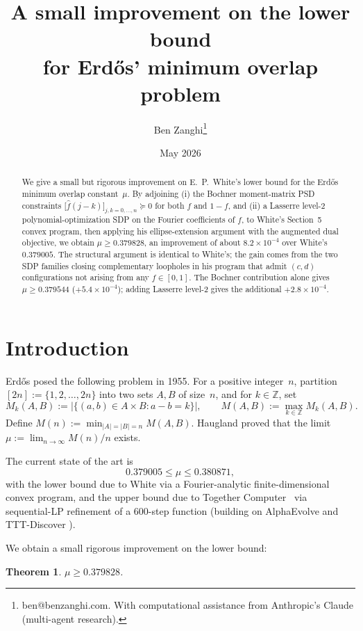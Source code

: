 \documentclass[11pt]{article}
\title{A small improvement on the lower bound\\
for Erd\H{o}s' minimum overlap problem}
\author{Ben Zanghi\thanks{ben@benzanghi.com. With computational assistance
from Anthropic's Claude (multi-agent research).}}
\date{May 2026}
\theoremstyle{plain}
\newtheorem{theorem}{Theorem}
\theoremstyle{definition}
\begin{document}
\maketitle

\begin{abstract}
We give a small but rigorous improvement on E.~P.~White's
\cite{White2023} lower bound for the Erd\H{o}s minimum overlap
constant~$\mu$. By adjoining (i) the Bochner moment-matrix PSD
constraints $\bigl[\hat f(j-k)\bigr]_{j,k=0,\dots,n} \succeq 0$ for both
$f$ and $1-f$, and (ii) a Lasserre level-2 polynomial-optimization SDP
on the Fourier coefficients of $f$, to White's Section~5 convex program,
then applying his ellipse-extension argument with the augmented dual
objective, we obtain $\mu \ge 0.379828$, an improvement of about
$8.2 \times 10^{-4}$ over White's $0.379005$. The structural argument
is identical to White's; the gain comes from the two SDP families
closing complementary loopholes in his program that admit $(c, d)$
configurations not arising from any $f \in [0, 1]$. The Bochner
contribution alone gives $\mu \ge 0.379544$ ($+5.4 \times 10^{-4}$);
adding Lasserre level-2 gives the additional $+2.8 \times 10^{-4}$.
\end{abstract}

\section{Introduction}

Erd\H{o}s \cite{Erdos1955} posed the following problem in 1955. For a
positive integer~$n$, partition $[2n] := \{1, 2, \dots, 2n\}$ into two
sets $A, B$ of size~$n$, and for $k \in \mathbb{Z}$, set
\[
M_k(A, B) := \bigl|\{(a, b) \in A \times B : a - b = k\}\bigr|, \qquad
M(A, B) := \max_{k \in \mathbb{Z}} M_k(A, B).
\]
Define $M(n) := \min_{|A| = |B| = n} M(A, B)$. Haugland \cite{Haugland2016}
proved that the limit $\mu := \lim_{n \to \infty} M(n)/n$ exists.

The current state of the art is
\[
0.379005 \le \mu \le 0.380871,
\]
with the lower bound due to White \cite{White2023} via a Fourier-analytic
finite-dimensional convex program, and the upper bound due to Together
Computer~\cite{TogetherComputer2026} via sequential-LP refinement of a
600-step function (building on AlphaEvolve \cite{AlphaEvolve2025} and
TTT-Discover \cite{TTTDiscover2026}).

We obtain a small rigorous improvement on the lower bound:

\begin{theorem}\label{thm:main}
$\mu \ge 0.379828$.
\end{theorem}
\end{document}
